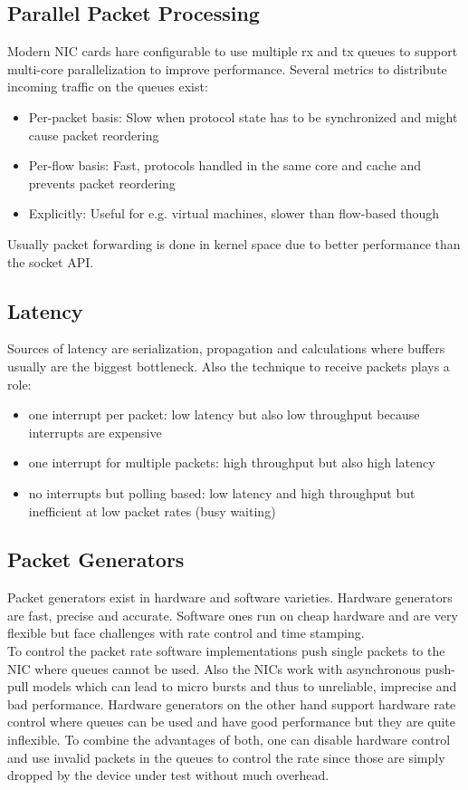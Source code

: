 \subsection{Parallel Packet Processing}
Modern NIC cards hare configurable to use multiple rx and tx queues to support multi-core parallelization to improve performance.
Several metrics to distribute incoming traffic on the queues exist:
\begin{itemize}
  \item Per-packet basis: Slow when protocol state has to be synchronized and might cause packet reordering
  \item Per-flow basis: Fast, protocols handled in the same core and cache and prevents packet reordering
  \item Explicitly: Useful for e.g. virtual machines, slower than flow-based though
\end{itemize}
Usually packet forwarding is done in kernel space due to better performance than the socket API.

\subsection{Latency}
Sources of latency are serialization, propagation and calculations where buffers usually are the biggest bottleneck.
Also the technique to receive packets plays a role:
\begin{itemize}
  \item one interrupt per packet: low latency but also low throughput because interrupts are expensive
  \item one interrupt for multiple packets: high throughput but also high latency
  \item no interrupts but polling based: low latency and high throughput but inefficient at low packet rates (busy waiting)
\end{itemize}

\subsection{Packet Generators}
Packet generators exist in hardware and software varieties.
Hardware generators are fast, precise and accurate.
Software ones run on cheap hardware and are very flexible but face challenges with rate control and time stamping.\\

To control the packet rate software implementations push single packets to the NIC where queues cannot be used.
Also the NICs work with asynchronous push-pull models which can lead to micro bursts and thus to unreliable, imprecise and bad performance.
Hardware generators on the other hand support hardware rate control where queues can be used and have good performance but they are quite inflexible.
To combine the advantages of both, one can disable hardware control and use invalid packets in the queues to control the rate since those are simply dropped by the device under test without much overhead.

